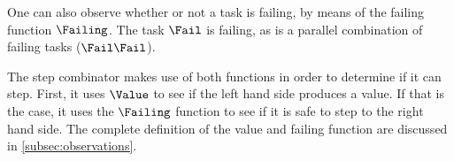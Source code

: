 One can also observe whether or not a task is failing, by means of the failing function $\Failing$.
The task $\Fail$ is failing, as is a parallel combination of failing tasks ($\Fail \And \Fail$).

The step combinator makes use of both functions in order to determine if it can step.
First, it uses $\Value$ to see if the left hand side produces a value.
If that is the case, it uses the $\Failing$ function to see if it is safe to step to the right hand side.
The complete definition of the value and failing function are discussed in \cref{subsec:observations}.
